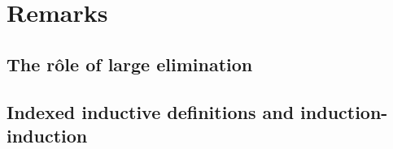 \documentclass{article}
\begin{document}
\section{Remarks} %
\label{sec:remarks}

\subsection{The r\^{o}le of large elimination}
\label{sec:large-elim}



\subsection{Indexed inductive definitions and induction-induction}
\label{sec:indexed-induction}






\end{document}
